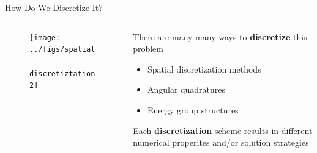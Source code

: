 \documentclass[xcolor=x11names,compress]{beamer}
\renewcommand{\(}{\begin{columns}}
\renewcommand{\)}{\end{columns}}
\newcommand{\<}[1]{\begin{column}{#1}}
\renewcommand{\>}{\end{column}}
\begin{document}
\begin{frame}{How Do We Discretize It?}

    \begin{columns}
    \begin{column}{0.5\textwidth}
        \begin{center}
 	    \begin{figure}
 	    \texttt{[image: ../figs/spatial-discretiztation2]}
        \end{figure}
 	    \end{center}
  	\end{column}
 	\begin{column}{0.4\textwidth}
        There are many many ways to \textbf{\textcolor{dgreen}{discretize}} this problem
        \begin{itemize}
        \item Spatial discretization methods
        \item Angular quadratures
        \item Energy group structures
        \end{itemize}
    
        \vspace*{1 em}
        Each \textbf{\textcolor{dgreen}{discretization}} scheme results in different 
        numerical properites and/or solution strategies
  	\end{column}
	\end{columns}
 
\end{frame}
\end{document}
